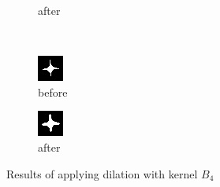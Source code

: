 \documentclass[12pt]{article}
\renewcommand{\subfiguresize}{.25\textwidth}
\begin{document}
\begin{figure}[H]
\begin{subfigure}[t]{\subfiguresize}
        \caption{after}
    \end{subfigure}\\[1em]
    \begin{subfigure}[t]{\subfiguresize}\centering
        \includegraphics[width=\textwidth]{img/image2.png}
        \caption{before}
    \end{subfigure}
    \hspace{2em}
    \begin{subfigure}[t]{\subfiguresize}\centering
        \includegraphics[width=\textwidth]{img/image2-dilation-4adj.png}
        \caption{after}
    \end{subfigure}
    \caption{Results of applying dilation with kernel $B_4$}
\end{figure} 
\end{document}
